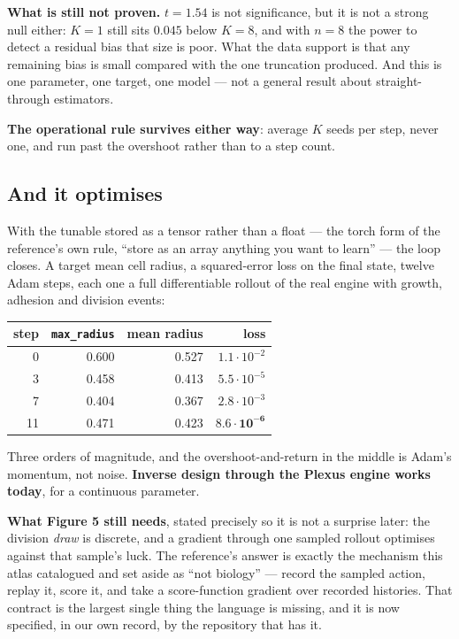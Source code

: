 \documentclass[11pt,a4paper]{article}
\newcommand{\code}[1]{\texttt{#1}}
\begin{document}
\textbf{What is still not proven.} $t = 1.54$ is not significance, but it is not a strong null
either: $K{=}1$ still sits $0.045$ below $K{=}8$, and with $n = 8$ the power to detect a residual
bias that size is poor. What the data support is that any remaining bias is small compared with the
one truncation produced. And this is one parameter, one target, one model --- not a general result
about straight-through estimators.

\textbf{The operational rule survives either way}: average $K$ seeds per step, never one, and run
past the overshoot rather than to a step count.

\subsection{And it optimises}

With the tunable stored as a tensor rather than a float --- the torch form of the reference's own
rule, ``store as an array anything you want to learn'' --- the loop closes. A target mean cell
radius, a squared-error loss on the final state, twelve Adam steps, each one a full differentiable
rollout of the real engine with growth, adhesion and division events:

\begin{center}
\small
\begin{tabular}{@{}r r r r@{}}
\toprule
step & \code{max\_radius} & mean radius & loss\\
\midrule
0 & 0.600 & 0.527 & $1.1{\cdot}10^{-2}$\\
3 & 0.458 & 0.413 & $5.5{\cdot}10^{-5}$\\
7 & 0.404 & 0.367 & $2.8{\cdot}10^{-3}$\\
11 & 0.471 & 0.423 & $\mathbf{8.6{\cdot}10^{-6}}$\\
\bottomrule
\end{tabular}
\end{center}

Three orders of magnitude, and the overshoot-and-return in the middle is Adam's momentum, not
noise. \textbf{Inverse design through the Plexus engine works today}, for a continuous parameter.

\textbf{What Figure 5 still needs}, stated precisely so it is not a surprise later: the division
\emph{draw} is discrete, and a gradient through one sampled rollout optimises against that
sample's luck. The reference's answer is exactly the mechanism this atlas catalogued and set aside
as ``not biology'' --- record the sampled action, replay it, score it, and take a score-function
gradient over recorded histories. That contract is the largest single thing the language is
missing, and it is now specified, in our own record, by the repository that has it.
\end{document}
